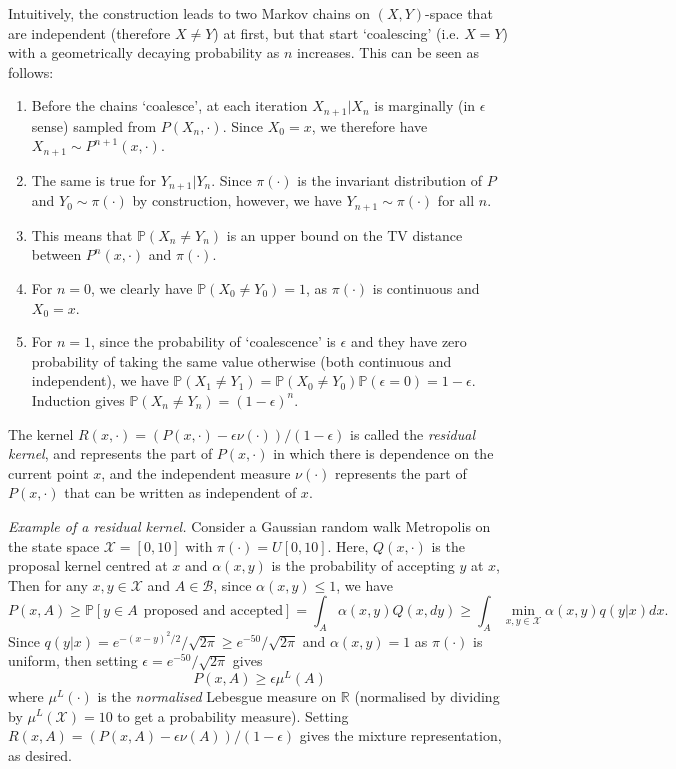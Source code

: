\documentclass{article}
\newcommand{\X}{\mathcal{X}}
\newcommand{\B}{\mathcal{B}}
\begin{document}
Intuitively, the construction leads to two Markov chains on $(X,Y)$-space that are independent (therefore $X\neq Y$) at first, but that start `coalescing' (i.e. $X=Y$) with a geometrically decaying probability as $n$ increases. This can be seen as follows:
\begin{enumerate}
\item Before the chains `coalesce', at each iteration $X_{n+1}|X_n$ is marginally (in $\epsilon$ sense) sampled from $P(X_n,\cdot)$. Since $X_0=x$, we therefore have $X_{n+1} \sim P^{n+1}(x,\cdot)$.
\item The same is true for $Y_{n+1}|Y_n$. Since $\pi(\cdot)$ is the invariant distribution  of $P$ and $Y_0\sim\pi(\cdot)$ by construction, however, we have $Y_{n+1} \sim \pi(\cdot)$ for all $n$.
\item This means that $\mathbb{P}(X_n \neq Y_n)$ is an upper bound on the TV distance between $P^{n}(x,\cdot)$ and $\pi(\cdot)$.
\item For $n=0$, we clearly have $\mathbb{P}(X_0 \neq Y_0)=1$, as $\pi(\cdot)$ is continuous and $X_0 = x$.
\item For $n=1$, since the probability of `coalescence' is $\epsilon$ and they have zero probability of taking the same value otherwise (both continuous and independent), we have $\mathbb{P}(X_1 \neq Y_1)=\mathbb{P}(X_0 \neq Y_0)\mathbb{P}(\epsilon=0)=1-\epsilon$.  Induction gives $\mathbb{P}(X_n \neq Y_n) = (1-\epsilon)^n$. 
\end{enumerate}

The kernel $R(x,\cdot) = (P(x,\cdot) - \epsilon\nu(\cdot))/(1-\epsilon)$ is called the \emph{residual kernel}, and represents the part of $P(x,\cdot)$ in which there is dependence on the current point $x$, and the independent measure $\nu(\cdot)$ represents the part of $P(x,\cdot)$ that can be written as independent of $x$.

\vspace{0.3cm}

\textit{Example of a residual kernel.}  Consider a Gaussian random walk Metropolis on the state space $\X = [0,10]$ with $\pi(\cdot) = U[0,10]$. Here,  $Q(x,\cdot)$ is the proposal kernel centred at $x$ and $\alpha(x,y)$ is the probability of accepting $y$ at $x$, Then for any $x,y \in \X$ and $A \in \B$, since $\alpha(x,y)\leq 1$, we have
\[
P(x,A) \geq \mathbb{P}[y \in A ~~ \text{proposed and accepted}] = \int_A \alpha(x,y)Q(x,dy) \geq \int_A \min_{x,y \in \X}{\alpha(x,y)q(y|x)} dx.
\]
Since $q(y|x) = e^{-(x-y)^2/2}/\sqrt{2\pi} \geq e^{-50}/\sqrt{2\pi}$ and $\alpha(x,y) = 1$ as $\pi(\cdot)$ is uniform, then setting $\epsilon = e^{-50}/\sqrt{2\pi}$ gives
\[
P(x,A) \geq \epsilon \mu^L(A)
\]
where $\mu^L(\cdot)$ is the \emph{normalised} Lebesgue measure on $\mathbb{R}$ (normalised by dividing by $\mu^L(\X) = 10$ to get a probability measure).  Setting $R(x,A) = (P(x,A) - \epsilon \nu(A))/(1-\epsilon)$ gives the mixture representation, as desired. 
\end{document}
